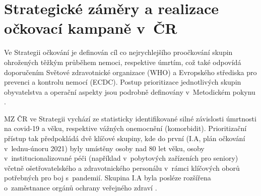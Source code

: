 




\section*{Strategické záměry a realizace \\ očkovací kampaně v~ČR}
\label{sec:strategie}

Ve Strategii očkování \cite{strategie_covid} je definován cíl co nejrychlejšího proočkování skupin ohrožených těžkým průběhem nemoci, respektive úmrtím, což také odpovídá doporučením Světové zdravotnické organizace (WHO) a Evropského střediska pro prevenci a kontrolu nemocí (ECDC). Postup prioritizace jednotlivých skupin obyvatelstva a operační aspekty jsou podrobně definovány v~Metodickém pokynu \cite{ockovani_mp}. %
%

MZ ČR ve Strategii vychází ze statisticky identifikované silné závislosti úmrtnosti na covid-19 a věku, respektive vážných onemocnění (komorbidit). Prioritizační pří\-stup tak předpokládá dvě klíčové skupiny, kde do první (I.A, plán očkování v~lednu-únoru 2021) byly umístěny osoby nad 80 let věku, osoby v~institucionalizované péči (například v~pobytových zařízeních pro seniory) včetně ošetřovatelského a zdravotnického personálu v~rámci klíčových oborů potřebných pro boj s~pandemií. Skupina I.A byla posléze rozšířena o~zaměstnance orgánů ochrany veřejného zdraví \cite{prioritizace_hygiena}. 

